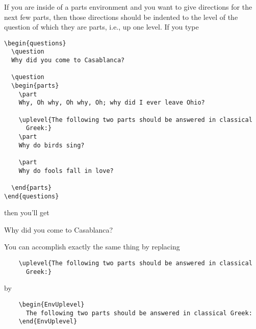 \documentclass[12pt]{exam}
\begin{document}
If you are inside of a parts environment and you want to give
directions for the next few parts, then those directions should be
indented to the level of the question of which they are parts, i.e.,
up one level.  If you type
\begin{verbatim}
\begin{questions}
  \question
  Why did you come to Casablanca?

  \question
  \begin{parts}
    \part
    Why, Oh why, Oh why, Oh; why did I ever leave Ohio?

    \uplevel{The following two parts should be answered in classical
      Greek:}
    \part
    Why do birds sing?

    \part
    Why do fools fall in love?

  \end{parts}
\end{questions}
\end{verbatim}
then you'll get
\begin{questions}
  \question
  Why did you come to Casablanca?

  \question
\end{questions}
You can accomplish exactly the same thing by replacing
\begin{verbatim}
    \uplevel{The following two parts should be answered in classical
      Greek:}
\end{verbatim}
by
\begin{verbatim}
    \begin{EnvUplevel}
      The following two parts should be answered in classical Greek:
    \end{EnvUplevel}
\end{verbatim}
\end{document}
